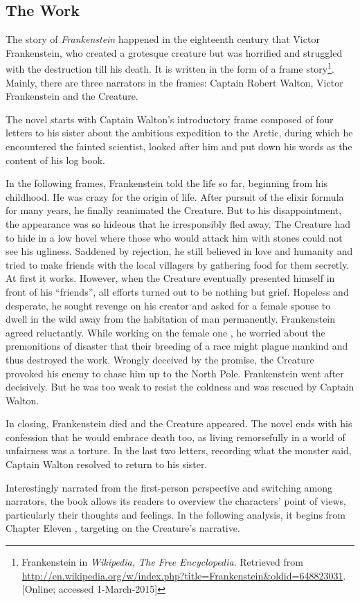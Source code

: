\subsection{The Work} %
\label{sub:the_work}
\begin{text}

The story of \textit{Frankenstein} happened in the eighteenth century that Victor Frankenstein, who created a grotesque creature but was horrified and struggled with the destruction till his death. It is written in the form of a frame story\footnote{Frankenstein in \textit{Wikipedia{,} The Free Encyclopedia}. Retrieved from \url{http://en.wikipedia.org/w/index.php?title=Frankenstein&oldid=648823031}. [Online; accessed 1-March-2015]}. Mainly, there are three narrators in the frames: Captain Robert Walton, Victor Frankenstein and the Creature.

The novel starts with Captain Walton's introductory frame composed of four letters to his sister about the ambitious expedition to the Arctic, during which he encountered the fainted scientist, looked after him and put down his words as the content of his log book.

In the following frames, Frankenstein told the life so far, beginning from his childhood. He was crazy for the origin of life. After pursuit of the elixir formula for many years, he finally reanimated the Creature. But to his disappointment, the appearance was so hideous that he irresponsibly fled away. The Creature had to hide in a low hovel where those who would attack him with stones could not see his ugliness. Saddened by rejection, he still believed in love and humanity and tried to make friends with the local villagers by gathering food for them secretly. At first it works. However, when the Creature eventually presented himself in front of his ``friends'', all efforts turned out to be nothing but grief. Hopeless and desperate, he sought revenge on his creator and asked for a female spouse to dwell in the wild away from the habitation of man permanently. Frankenstein agreed reluctantly. While working on the female one , he worried about the premonitions of disaster that their breeding of a race might plague mankind and thus destroyed the work. Wrongly deceived by the promise, the Creature provoked his enemy to chase him up to the North Pole. Frankenstein went after decisively. But he was too weak to resist the coldness and was rescued by Captain Walton.

In closing, Frankenstein died and the Creature appeared. The novel ends with his confession that he would embrace death too, as living remorsefully in a world of unfairness was a torture. In the last two letters, recording what the monster said, Captain Walton resolved to return to his sister.

Interestingly narrated from the first-person perspective and switching among narrators, the book allows its readers to overview the characters' point of views, particularly their thoughts and feelings. In the following analysis, it begins from Chapter Eleven , targeting on the Creature's narrative.

\end{text}
